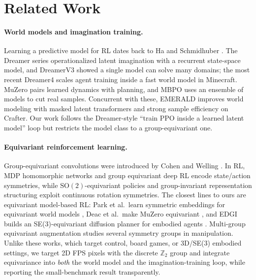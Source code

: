 \documentclass[preprint,12pt]{elsarticle}
\begin{document}
\section{Related Work}\label{sec:rw}

\paragraph{World models and imagination training.}
Learning a predictive model for RL dates back to Ha and Schmidhuber
\cite{worldmodels2018}. The Dreamer series \cite{dreamerv1,dreamerv2}
operationalized latent imagination with a recurrent state-space model, and
DreamerV3 \cite{dreamerv3} showed a single model can solve many domains; the
most recent Dreamer4 \cite{dreamer42025} scales agent training inside a
fast world model in Minecraft. MuZero \cite{muzero2020} pairs learned
dynamics with planning, and MBPO \cite{mbpo2019} uses an ensemble of models
to cut real samples. Concurrent with these, EMERALD \cite{emerald2025}
improves world modeling with masked latent transformers and strong
sample efficiency on Crafter. Our work follows the Dreamer-style
``train PPO inside a learned latent model'' loop but restricts the model class
to a group-equivariant one.

\paragraph{Equivariant reinforcement learning.}
Group-equivariant convolutions were introduced by Cohen and Welling
\cite{gcnn2016}. In RL, MDP homomorphic networks \cite{mdphomo2020} and group
equivariant deep RL \cite{geodrl2020} encode state/action symmetries, while
$\mathrm{SO}(2)$-equivariant policies \cite{so2rl2022} and group-invariant
representation structuring \cite{groupinv2022} exploit continuous rotation
symmetries. The closest lines to ours are equivariant model-based RL: Park
et al.\ learn symmetric embeddings for equivariant world models
\cite{sen2022}, Deac et al.\ make MuZero equivariant \cite{eqmuzero2023},
and EDGI builds an SE(3)-equivariant diffusion planner for embodied agents
\cite{edgi2023}. Multi-group equivariant augmentation \cite{multigroup2025}
studies several symmetry groups in manipulation. Unlike these works, which
target control, board games, or 3D/SE(3) embodied settings, we target 2D
FPS pixels with the discrete $\mathbb Z_2$ group and integrate equivariance
into \emph{both} the world model and the imagination-training loop, while
reporting the small-benchmark result transparently.
\end{document}
